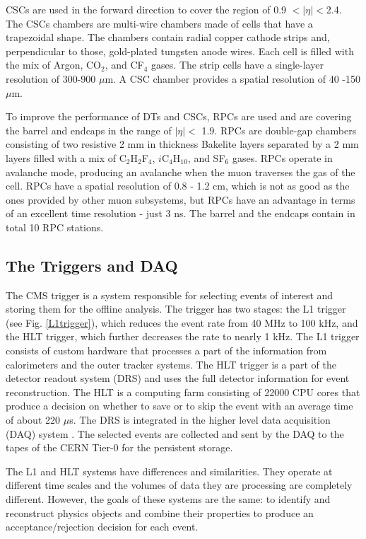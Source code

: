 \begin{normalsize}
CSCs are used in the forward direction to cover the region of 0.9 $ <|\eta|<$2.4. The CSCs chambers are multi-wire chambers made of cells  that have a trapezoidal shape. The chambers contain radial copper cathode strips and, perpendicular to those, gold-plated tungsten anode wires. Each cell is filled with the mix of Argon, CO$_2$, and CF$_4$ gases. The strip cells have a single-layer resolution of 300-900 $\mu$m. A CSC chamber provides a spatial resolution of 40 -150 $\mu$m.


To improve the performance of DTs and CSCs, RPCs are used and are covering the barrel and endcaps in the range of $|\eta| <$ 1.9. 
RPCs are double-gap chambers consisting of two resistive 2 mm in thickness Bakelite layers separated by a 2 mm layers filled with a mix of C$_2$H$_2$F$_4$, $i$C$_4$H$_{10}$, and SF$_6$ gases. RPCs operate in avalanche mode, producing an avalanche when the muon traverses the gas of the cell. RPCs have a spatial resolution of 0.8 - 1.2 cm, which is not as good as the ones provided by other muon subsystems, but RPCs have an advantage in terms of an excellent time resolution - just 3 ns. The barrel and the endcaps contain in total 10 RPC stations.



\subsection{The Triggers and DAQ}

The CMS trigger \cite{Trigger} is a system responsible for selecting events of interest and storing them for the offline analysis. The trigger has two stages: the L1 trigger (see Fig. \ref{L1trigger}), which reduces the event rate from 40 MHz to 100 kHz, and the HLT trigger, which further decreases the rate to nearly 1 kHz. The L1 trigger consists of custom hardware that processes a part of the information from calorimeters and the outer tracker systems. The HLT trigger is a part of the detector readout system (DRS) and uses the full detector information for event reconstruction. The HLT is a computing farm consisting of 22000 CPU cores that produce a decision on whether to save or to skip the event with an average time of about 220 $\mu$s. The DRS is integrated in the higher level data acquisition (DAQ) system \cite{DAQ}. The selected events are collected and sent by the DAQ to the tapes of the CERN Tier-0 for the persistent storage. 

The L1 and HLT systems have differences and similarities. They operate at different time scales and the volumes of data they are processing are completely different. However, the goals of these systems are the same: to identify and reconstruct physics objects and combine their properties to produce an acceptance/rejection decision for each event. 



\end{normalsize}
